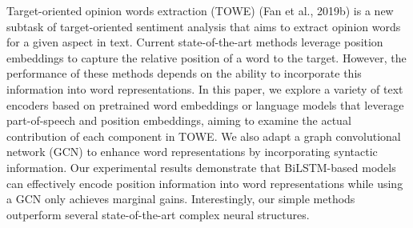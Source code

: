 Target-oriented opinion words extraction (TOWE) (Fan et al., 2019b) is a new subtask of target-oriented sentiment analysis that aims to extract opinion words for a given aspect in text. Current state-of-the-art methods leverage position embeddings to capture the relative position of a word to the target. However, the performance of these methods depends on the ability to incorporate this information into word representations. In this paper, we explore a variety of text encoders based on pretrained word embeddings or language models that leverage part-of-speech and position embeddings, aiming to examine the actual contribution of each component in TOWE. We also adapt a graph convolutional network (GCN) to enhance word representations by incorporating syntactic information. Our experimental results demonstrate that BiLSTM-based models can effectively encode position information into word representations while using a GCN only achieves marginal gains. Interestingly, our simple methods outperform several state-of-the-art complex neural structures.
